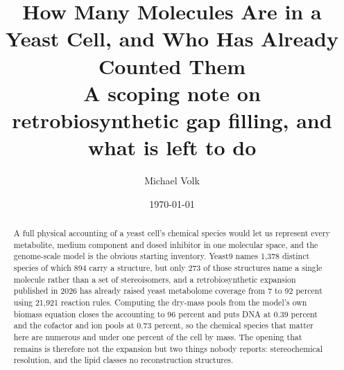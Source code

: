 \documentclass[10pt,a4paper]{article}
\title{\vspace{-1.5em}How Many Molecules Are in a Yeast Cell, and Who Has Already Counted Them\\
  {\large A scoping note on retrobiosynthetic gap filling, and what is left to do}}
\author{Michael Volk}
\date{\today}
\begin{document}
\maketitle
\thispagestyle{empty}

\begin{abstract}
\noindent
A full physical accounting of a yeast cell's chemical species would let us represent every
metabolite, medium component and dosed inhibitor in one molecular space, and the genome-scale
model is the obvious starting inventory. Yeast9 names 1{,}378 distinct species of which 894
carry a structure, but only 273 of those structures name a single molecule rather than a set
of stereoisomers, and a retrobiosynthetic expansion published in 2026 has already raised yeast
metabolome coverage from 7 to 92 percent using 21{,}921 reaction rules. Computing the dry-mass pools from the model's own biomass equation closes the accounting to
96 percent and puts DNA at 0.39 percent and the cofactor and ion pools at 0.73 percent, so the
chemical species that matter here are numerous and under one percent of the cell by mass. The
opening that remains is therefore not the expansion but two things nobody reports:
stereochemical resolution, and the lipid classes no reconstruction structures.
\end{abstract}

\vspace{0.5em}





\end{document}
